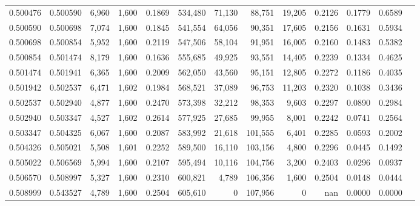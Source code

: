 \begin{tabular}{rrrrrrrrrrrrr}
0.500476 & 0.500590 &  6,960 & 1,600 &                                     0.1869 & 534,480 &  71,130 &  88,751 &  19,205 & 0.2126 & 0.1779 & 0.6589 \\
0.500590 & 0.500698 &  7,074 & 1,600 &                                     0.1845 & 541,554 &  64,056 &  90,351 &  17,605 & 0.2156 & 0.1631 & 0.5934 \\
0.500698 & 0.500854 &  5,952 & 1,600 &                                     0.2119 & 547,506 &  58,104 &  91,951 &  16,005 & 0.2160 & 0.1483 & 0.5382 \\
0.500854 & 0.501474 &  8,179 & 1,600 &                                     0.1636 & 555,685 &  49,925 &  93,551 &  14,405 & 0.2239 & 0.1334 & 0.4625 \\
0.501474 & 0.501941 &  6,365 & 1,600 &                                     0.2009 & 562,050 &  43,560 &  95,151 &  12,805 & 0.2272 & 0.1186 & 0.4035 \\
0.501942 & 0.502537 &  6,471 & 1,602 &                                     0.1984 & 568,521 &  37,089 &  96,753 &  11,203 & 0.2320 & 0.1038 & 0.3436 \\
0.502537 & 0.502940 &  4,877 & 1,600 &                                     0.2470 & 573,398 &  32,212 &  98,353 &   9,603 & 0.2297 & 0.0890 & 0.2984 \\
0.502940 & 0.503347 &  4,527 & 1,602 &                                     0.2614 & 577,925 &  27,685 &  99,955 &   8,001 & 0.2242 & 0.0741 & 0.2564 \\
0.503347 & 0.504325 &  6,067 & 1,600 &                                     0.2087 & 583,992 &  21,618 & 101,555 &   6,401 & 0.2285 & 0.0593 & 0.2002 \\
0.504326 & 0.505021 &  5,508 & 1,601 &                                     0.2252 & 589,500 &  16,110 & 103,156 &   4,800 & 0.2296 & 0.0445 & 0.1492 \\
0.505022 & 0.506569 &  5,994 & 1,600 &                                     0.2107 & 595,494 &  10,116 & 104,756 &   3,200 & 0.2403 & 0.0296 & 0.0937 \\
0.506570 & 0.508997 &  5,327 & 1,600 &                                     0.2310 & 600,821 &   4,789 & 106,356 &   1,600 & 0.2504 & 0.0148 & 0.0444 \\
0.508999 & 0.543527 &  4,789 & 1,600 &                                     0.2504 & 605,610 &       0 & 107,956 &       0 &    nan & 0.0000 & 0.0000 \\
\bottomrule
\end{tabular}
